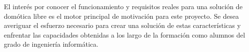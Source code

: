 \vspace{0.5cm}

El interés por conocer el funcionamiento y requisitos reales para una solución de domótica libre es el motor principal de motivación para este proyecto. Se desea averiguar el esfuerzo necesario para crear una solución de estas características y enfrentar las capacidades obtenidas a los largo de la formación como alumnos del grado de ingeniería informática.
